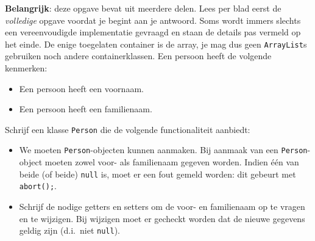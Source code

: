 \documentclass[a4paper,solution]{khltoets}
\begin{document}

\BEGINASSIGNMENT
\textbf{Belangrijk}: deze opgave bevat uit meerdere delen.
Lees per blad eerst de \emph{volledige} opgave voordat je begint aan je ant\-woord.
Soms wordt immers slechts een vereenvoudigde implementatie gevraagd en staan  de details pas vermeld op het einde.
De enige toegelaten container is de array, je mag dus
geen {\tt ArrayList}s gebruiken noch andere containerklassen.
\vskip4mm
Een persoon heeft de volgende kenmerken:
\begin{itemize}
  \item Een persoon heeft een voornaam.
  \item Een persoon heeft een familienaam.
\end{itemize}
Schrijf een klasse {\tt Person} die de volgende functionaliteit aanbiedt:
\begin{itemize}
  \item We moeten {\tt Person}-objecten kunnen aanmaken.
        Bij aanmaak van een {\tt Person}-object moeten zowel voor- als familienaam
        gegeven worden. Indien \'e\'en van beide (of beide) {\tt null} is,
        moet er een fout gemeld worden: dit gebeurt met {\tt abort();}.
  \item Schrijf de nodige getters en setters om de voor- en familienaam
        op te vragen en te wijzigen. Bij wijzigen moet er gecheckt worden
        dat de nieuwe gegevens geldig zijn (d.i.\ niet {\tt null}).
\end{itemize}
\ENDASSIGNMENT

\BEGINSOLUTION
{}
\ENDSOLUTION
\end{document}

